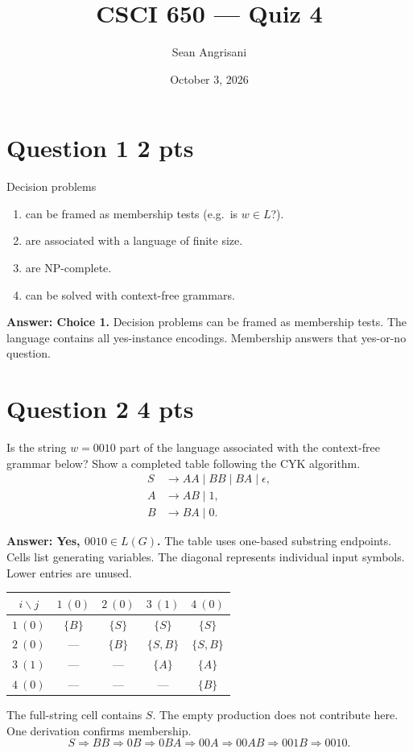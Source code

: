 \documentclass{article}
\title{CSCI 650 --- Quiz 4}
\author{Sean Angrisani}
\date{October 3, 2026}
\begin{document}
\maketitle

\section*{Question 1 \hfill 2 pts}
Decision problems
\begin{enumerate}
    \item can be framed as membership tests (e.g.\ is $w\in L$?).
    \item are associated with a language of finite size.
    \item are NP-complete.
    \item can be solved with context-free grammars.
\end{enumerate}

\noindent\textbf{Answer: Choice 1.}
Decision problems can be framed as membership tests.
The language contains all yes-instance encodings.
Membership answers that yes-or-no question.

\section*{Question 2 \hfill 4 pts}
Is the string $w=0010$ part of the language associated with the
context-free grammar below? Show a completed table following the
CYK algorithm.
\[
\begin{aligned}
S &\to AA\mid BB\mid BA\mid\epsilon,\\
A &\to AB\mid 1,\\
B &\to BA\mid 0.
\end{aligned}
\]

\noindent\textbf{Answer: Yes, $0010\in L(G)$.}
The table uses one-based substring endpoints.
Cells list generating variables.
The diagonal represents individual input symbols.
Lower entries are unused.

\begin{center}
\renewcommand{\arraystretch}{1.35}
\begin{tabular}{c|cccc}
$i\backslash j$ & $1\ (0)$ & $2\ (0)$ & $3\ (1)$ & $4\ (0)$ \\ \hline
$1\ (0)$ & $\{B\}$ & $\{S\}$ & $\{S\}$ & $\{S\}$ \\
$2\ (0)$ & --- & $\{B\}$ & $\{S,B\}$ & $\{S,B\}$ \\
$3\ (1)$ & --- & --- & $\{A\}$ & $\{A\}$ \\
$4\ (0)$ & --- & --- & --- & $\{B\}$
\end{tabular}
\end{center}

The full-string cell contains $S$.
The empty production does not contribute here.
One derivation confirms membership.
\[
S\Rightarrow BB\Rightarrow 0B\Rightarrow 0BA\Rightarrow 00A
 \Rightarrow 00AB\Rightarrow 001B\Rightarrow 0010.
\]
\end{document}
